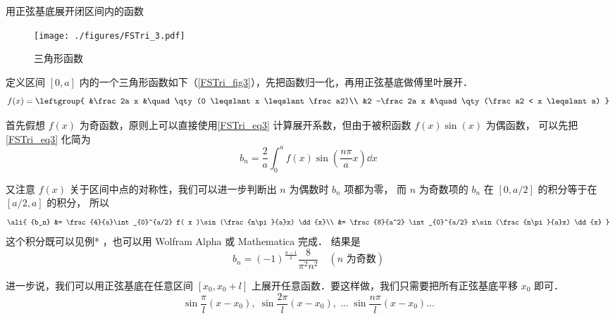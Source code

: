 \begin{example}{用正弦基底展开闭区间内的函数}

\begin{figure}[ht]
\centering
\texttt{[image: ./figures/FSTri\_3.pdf]}
\caption{三角形函数} \label{FSTri_fig3}
\end{figure}

定义区间 $[0,a]$ 内的一个三角形函数如下（\autoref{FSTri_fig3}），先把函数归一化，再用正弦基底做傅里叶展开．
\begin{equation}
f(x) = \leftgroup{
&\frac2a x &\quad \qty(0 \leqslant x \leqslant \frac a2)\\
&2 -\frac2a x &\quad \qty(\frac a2 < x \leqslant a)
}\end{equation}

首先假想 $f(x)$ 为奇函数，原则上可以直接使用\autoref{FSTri_eq3} 计算展开系数，但由于被积函数 $f(x)\sin(x)$ 为偶函数， 可以先把\autoref{FSTri_eq3} 化简为%
\begin{equation}
{b_n} = \frac{2}{a}\int_{0}^a f( x )\sin (\frac{n\pi}{a}x) \dd{x}
\end{equation}

又注意 $f(x)$ 关于区间中点的对称性，我们可以进一步判断出 $n$ 为偶数时 $b_n$ 项都为零， 而 $n$ 为奇数项的 $b_n$ 在 $[0, a/2]$ 的积分等于在 $[a/2, a]$ 的积分， 所以
\begin{equation}
\ali{
{b_n} &= \frac{4}{a}\int_{0}^{a/2} f( x )\sin (\frac{n\pi}{a}x) \dd{x}\\
&= \frac{8}{a^2} \int_{0}^{a/2} x\sin (\frac{n\pi}{a}x) \dd{x}
}\end{equation}
这个积分既可以见例*%
，也可以用 Wolfram Alpha 或 Mathematica 完成．%
结果是
\begin{equation}
b_n = (-1)^{\frac{n-1}{2}} \frac{8}{\pi^2 n^2} \quad (\text{$n$ 为奇数})
\end{equation}

\end{example}

进一步说，我们可以用正弦基底在任意区间 $[x_0,x_0+l]$ 上展开任意函数．要这样做，我们只需要把所有正弦基底平移 $x_0$ 即可．
\begin{equation}
\sin\frac{\pi}{l} (x-x_0),\;   \sin\frac{2\pi}{l} (x-x_0),\;    \dots\;\sin\frac{n\pi}{l} (x-x_0) \dots
\end{equation}



